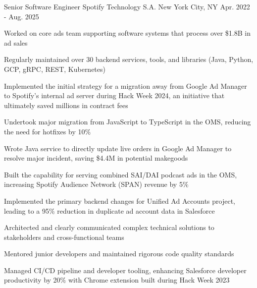 \begin{cventries}
  \cventry
    {Senior Software Engineer} %
    {Spotify Technology S.A.} %
    {New York City, NY} %
    {Apr. 2022 - Aug. 2025} %
    {
      \begin{cvitems} 
        \item {Worked on core ads team supporting software systems that process over \$1.8B in ad sales}
        \item {Regularly maintained over 30 backend services, tools, and libraries (Java, Python, GCP, gRPC, REST, Kubernetes)}
        \item {Implemented the initial strategy for a migration away from Google Ad Manager to Spotify's internal ad server during Hack Week 2024, an initiative that ultimately saved millions in contract fees}
        \item {Undertook major migration from JavaScript to TypeScript in the OMS, reducing the need for hotfixes by 10\%}
        \item {Wrote Java service to directly update live orders in Google Ad Manager to resolve major incident, saving \$4.4M in potential makegoods}
        \item {Built the capability for serving combined SAI/DAI podcast ads in the OMS, increasing Spotify Audience Network (SPAN) revenue by 5\%}
        \item {Implemented the primary backend changes for Unified Ad Accounts project, leading to a 95\% reduction in duplicate ad account data in Salesforce}
        \item {Architected and clearly communicated complex technical solutions to stakeholders and cross-functional teams}
        \item {Mentored junior developers and maintained rigorous code quality standards}
        \item {Managed CI/CD pipeline and developer tooling, enhancing Salesforce developer productivity by 20\% with Chrome extension built during Hack Week 2023}
      \end{cvitems}
    }


\end{cventries}
